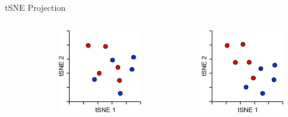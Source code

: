 \begin{frame}[allowframebreaks]{tSNE Projection}
\begin{columns}
\begin{column}{0.2\textwidth}
\begin{figure}
        \end{figure}
    \end{column}
    \begin{column}{0.2\textwidth}
        \begin{figure}
            \centering
            \includegraphics[width=1\textwidth,keepaspectratio]{images/dul/dim-reduce/slide_31_3_img.png}
        \end{figure}
    \end{column}
    \begin{column}{0.2\textwidth}
        \begin{figure}
            \centering
            \includegraphics[width=1\textwidth,keepaspectratio]{images/dul/dim-reduce/slide_31_4_img.png}

\end{figure}
\end{column}
\end{columns}
\end{frame}
